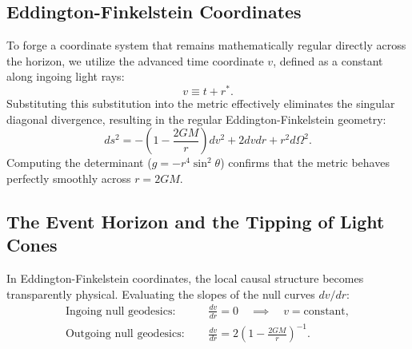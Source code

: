 \documentclass[11pt, a4paper]{report}
\begin{document}
\subsection{Eddington-Finkelstein Coordinates}
To forge a coordinate system that remains mathematically regular directly across the horizon, we utilize the advanced time coordinate $v$, defined as a constant along ingoing light rays:
\begin{equation}
\label{eq:advanced_v}
v \equiv t + r^{*}.
\end{equation}
Substituting this substitution into the metric effectively eliminates the singular diagonal divergence, resulting in the regular Eddington-Finkelstein geometry:
\begin{equation}
\label{eq:eddington_metric}
ds^{2} = -\left( 1 - \frac{2GM}{r} \right)dv^{2} + 2 dv dr + r^{2} d\Omega^{2}.
\end{equation}
Computing the determinant ($g = -r^{4}\sin^{2}\theta$) confirms that the metric behaves perfectly smoothly across $r=2GM$.

\subsection{The Event Horizon and the Tipping of Light Cones}
In Eddington-Finkelstein coordinates, the local causal structure becomes transparently physical. Evaluating the slopes of the null curves $dv/dr$:
\begin{align}
\text{Ingoing null geodesics: } \quad &\frac{dv}{dr} = 0 \quad \implies \quad v = \text{constant}, \\
\text{Outgoing null geodesics: } \quad &\frac{dv}{dr} = 2 \left( 1 - \frac{2GM}{r} \right)^{-1}.
\end{align}
\end{document}
